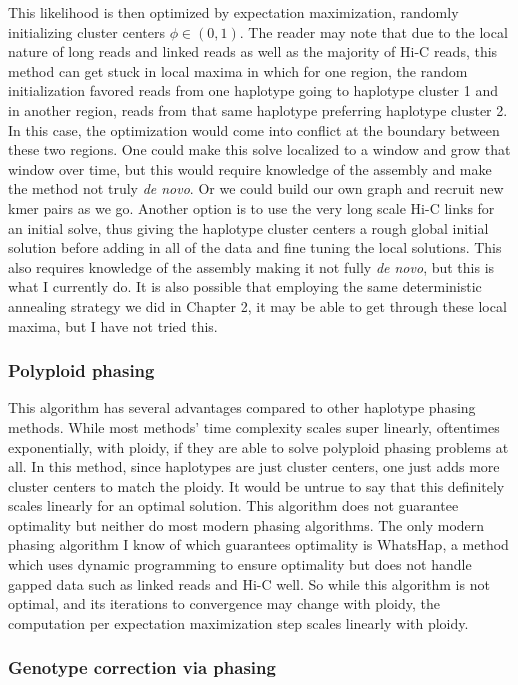 \par{
This likelihood is then optimized by expectation maximization, randomly initializing cluster centers $\phi \in (0,1)$. The reader may note that due to the local nature of long reads and linked reads as well as the majority of Hi-C reads, this method can get stuck in local maxima in which for one region, the random initialization favored reads from one haplotype going to haplotype cluster 1 and in another region, reads from that same haplotype preferring haplotype cluster 2. In this case, the optimization would come into conflict at the boundary between these two regions. One could make this solve localized to a window and grow that window over time, but this would require knowledge of the assembly and make the method not truly \textit{de novo}. Or we could build our own graph and recruit new kmer pairs as we go. Another option is to use the very long scale Hi-C links for an initial solve, thus giving the haplotype cluster centers a rough global initial solution before adding in all of the data and fine tuning the local solutions. This also requires knowledge of the assembly making it not fully \textit{de novo}, but this is what I currently do. It is also possible that employing the same deterministic annealing strategy we did in Chapter 2, it may be able to get through these local maxima, but I have not tried this.
}
\subsubsection{Polyploid phasing}
\par{
This algorithm has several advantages compared to other haplotype phasing methods. While most methods' time complexity scales super linearly, oftentimes exponentially, with ploidy, if they are able to solve polyploid phasing problems at all. In this method, since haplotypes are just cluster centers, one just adds more cluster centers to match the ploidy. It would be untrue to say that this definitely scales linearly for an optimal solution. This algorithm does not guarantee optimality but neither do most modern phasing algorithms. The only modern phasing algorithm I know of which guarantees optimality is WhatsHap, a method which uses dynamic programming to ensure optimality but does not handle gapped data such as linked reads and Hi-C well\cite{whatshap}. So while this algorithm is not optimal, and its iterations to convergence may change with ploidy, the computation per expectation maximization step scales linearly with ploidy.
}
\subsubsection{Genotype correction via phasing}

